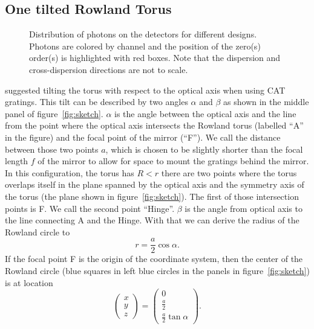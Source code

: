 \documentclass[linenumbers]{aastex631}
\begin{document}
\subsection{One tilted Rowland Torus}


\begin{figure*}
    \caption{Distribution of photons on the detectors for different designs. Photons are colored by channel and the position of the zero(s) order(s) is highlighted with red boxes. Note that the dispersion and cross-dispersion directions are not to scale.
        }
    \label{fig:fish}
\end{figure*}

\citet{doi:10.1117/12.856482} suggested tilting the torus with respect to the optical axis when using CAT gratings.
This tilt can be described by two angles $\alpha$ and $\beta$ as shown in the middle panel of figure~\ref{fig:sketch}. $\alpha$ is the angle between the optical axis and the line from the point where the optical axis intersects the Rowland torus (labelled ``A'' in the figure) and the focal point of the mirror (``F''). We call the distance between those two points $a$, which is chosen to be slightly shorter than the focal length $f$ of the mirror to allow for space to mount the gratings behind the mirror.
In this configuration, the torus has $R < r$ there are two points where the torus overlaps itself in the plane spanned by the optical axis and the symmetry axis of the torus (the plane shown in figure~\ref{fig:sketch}). The first of those intersection points is F. We call the second point ``Hinge''.
$\beta$ is the angle from optical axis to the line connecting A and the Hinge. With that we can derive the radius of the Rowland circle to
$$r = \frac{a}{2}\cos \alpha.$$
 If the focal point F is the origin of the coordinate system, then the center of the Rowland circle (blue squares in left blue circles in the panels in figure~\ref{fig:sketch}) is at location
 \begin{equation}
    \begin{pmatrix} x \\ y \\ z \end{pmatrix} =
    \begin{pmatrix} 0 \\ \frac{a}{2} \\  \frac{a}{2}\tan\alpha \end{pmatrix}.
 \end{equation}
\end{document}
